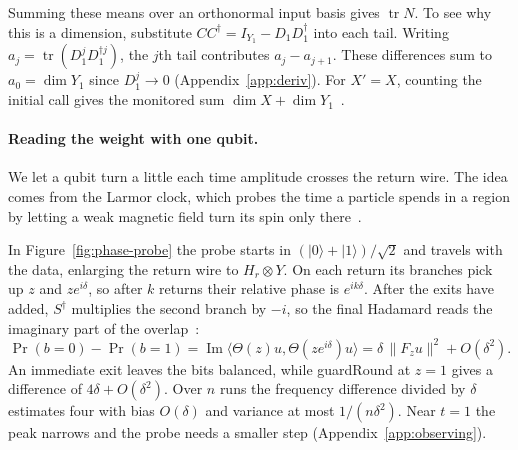 \documentclass[acmsmall,screen,review,anonymous,nonacm]{acmart}
\newcommand{\storyinlineface}{\small\ttfamily}
\newcommand{\code}[1]{\textnormal{\storyinlineface #1}}
\newcommand{\tr}{\operatorname{tr}}
\newcommand{\ket}[1]{\lvert #1\rangle}
\numberwithin{equation}{section}
\begin{document}
Summing these means over an orthonormal input basis gives $\tr N$. To see why this is a dimension, substitute $CC^\dagger=I_{Y_1}-D_1D_1^\dagger$ into each tail. Writing $a_j=\tr(D_1^jD_1^{\dagger j})$, the $j$th tail contributes $a_j-a_{j+1}$. These differences sum to $a_0=\dim Y_1$ since $D_1^j\to0$ (Appendix~\ref{app:deriv}). For $X'=X$, counting the initial call gives the monitored sum $\dim X+\dim Y_1$~\cite[Thm.~3.2, Eq.~(9)]{Bourgain14Subspace}.

\paragraph{Reading the weight with one qubit.}
We let a qubit turn a little each time amplitude crosses the return wire.
The idea comes from the Larmor clock, which probes the time a particle
spends in a region by letting a weak magnetic field turn its spin only
there~\cite{Buttiker83Larmor,Steinberg95Dwell}.

In Figure~\ref{fig:phase-probe} the probe starts in $(\ket0+\ket1)/\sqrt2$ and travels with the data, enlarging the return wire to $H_r\otimes Y$. On each return its branches pick up $z$ and $ze^{i\delta}$, so after $k$ returns their relative phase is $e^{ik\delta}$.
After the exits have added, $S^\dagger$ multiplies the second branch by $-i$,
so the final Hadamard reads the imaginary part of the overlap~\cite[p.~1, following Eq.~(3)]{Childs13Hadamard}:
\[
 \Pr(b=0)-\Pr(b=1)
 =\operatorname{Im}\langle\Theta(z)u,\Theta(ze^{i\delta})u\rangle
 =\delta\,\|F_z u\|^2+O(\delta^2).
\]
An immediate exit leaves the bits balanced, while \code{guardRound} at $z=1$ gives a difference of $4\delta+O(\delta^2)$. Over $n$ runs the frequency difference divided by $\delta$ estimates four with bias $O(\delta)$ and variance at most $1/(n\delta^2)$. Near $t=1$ the peak narrows and the probe needs a smaller step (Appendix~\ref{app:observing}).
\end{document}

